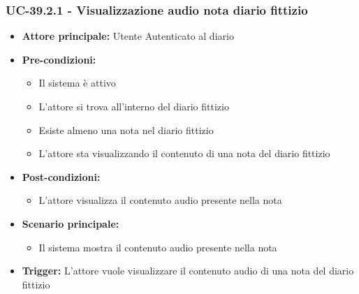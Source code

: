 \documentclass[a4paper,12pt]{article}
\begin{document}
\subsubsection{UC-39.2.1 - Visualizzazione audio nota diario fittizio} \label{subsec:UC-39.2.1}
\begin{itemize}
    \item \textbf{Attore principale:} Utente Autenticato al diario
    \item \textbf{Pre-condizioni:}
    \begin{itemize}
        \item Il sistema è attivo
        \item L'attore si trova all'interno del diario fittizio
        \item Esiste almeno una nota nel diario fittizio
        \item L'attore sta visualizzando il contenuto di una nota del diario fittizio
    \end{itemize}
    \item \textbf{Post-condizioni:}
    \begin{itemize}
        \item L'attore visualizza il contenuto audio presente nella nota
    \end{itemize}
    \item \textbf{Scenario principale:}
    \begin{itemize}
        \item Il sistema mostra il contenuto audio presente nella nota 
    \end{itemize}
    \item \textbf{Trigger:} L'attore vuole visualizzare il contenuto audio di una nota del diario fittizio
\end{itemize}
\end{document}

